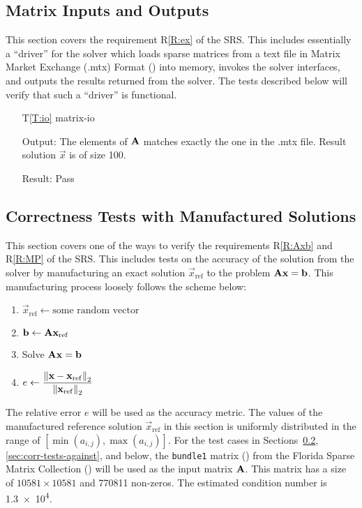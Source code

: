 \documentclass[12pt, titlepage]{article}
\newcommand{\rref}[1]{R\ref{#1}}
\newcommand{\tref}[1]{T\ref{#1}}
\begin{document}
\subsection{Matrix Inputs and Outputs}

This section covers the requirement \rref{R:ex} of the SRS. This includes
essentially a ``driver'' for the solver which loads sparse matrices from a text
file in Matrix Market Exchange (.mtx) Format (\cite{noauthor_matrix_2013}) into memory,
invokes the solver interfaces, and outputs the results returned from the solver.
The tests described below will verify that such a ``driver'' is functional.

\begin{itemize}

\item[\tref{T:io}]{matrix-io}

  Output: The elements of \(\mathbf{A}\) matches exactly the one in the .mtx file.
  Result solution \(\vec{x}\) is of size \num{100}.

  Result: Pass
\end{itemize}

\subsection{Correctness Tests with Manufactured Solutions}
\label{sec:corr-tests-with}

This section covers one of the ways to verify the requirements \rref{R:Axb} and
\rref{R:MP} of the SRS. This includes tests on the accuracy of the solution from
the solver by manufacturing an exact solution \(\vec{x}_\mathrm{ref}\) to the
problem \(\mathbf{A}\mathbf{x} = \mathbf{b}\). This manufacturing process loosely
follows the scheme below:

\begin{enumerate}
\item \(\vec{x}_\mathrm{ref} \gets \text{some random vector}\)
\item \(\mathbf{b} \gets \mathbf{A} \mathbf{x}_\mathrm{ref} \)
\item Solve \(\mathbf{A}\mathbf{x} = \mathbf{b}\)
\item \(e \gets \displaystyle \frac{\left\lVert\mathbf{x} - \mathbf{x}_\mathrm{ref}\right\rVert_2}{\left\lVert\mathbf{x}_\mathrm{ref}\right\rVert_2}\)
\end{enumerate}

The relative error \(e\) will be used as the accuracy metric. The values of the
manufactured reference solution \(\vec{x}_\mathrm{ref}\) in this section is
uniformly distributed in the range of \([\min(a_{i,j}), \max(a_{i,j})]\). For
the test cases in Sections~\ref{sec:corr-tests-with},
\ref{sec:corr-tests-against}, and below, the \texttt{bundle1} matrix
(\cite{m_lourakis_lourakisbundle1_2006}) from the Florida Sparse Matrix
Collection (\cite{davis_university_2011}) will be used as the input matrix
\(\mathbf{A}\). This matrix has a size of \(\num{10581} \times \num{10581}\) and
\num{770811} non-zeros. The estimated condition number is \num{1.3e4}.
\end{document}
